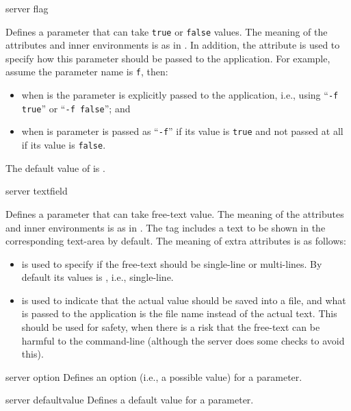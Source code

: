 \bigskip
\xmlstruct
{server}
{flag}
{%
%
  Defines a parameter that can take \texttt{true} or \texttt{false}
  values. The meaning of the attributes and inner environments is as
  in . In addition, the attribute
   is used to specify how this parameter
  should be passed to the application. For example, assume the
  parameter name is \texttt{f}, then:
  \begin{itemize}
  \item when  is  the
    parameter is explicitly passed to the application, i.e., using
    ``\texttt{-f true}'' or ``\texttt{-f false}''; and
  \item when  is 
    parameter is passed as ``\texttt{-f}'' if its value is
    \texttt{true} and not passed at all if its value is
    \texttt{false}.
  \end{itemize}
%
  The default value of  is
  .
%
}


\bigskip
\xmlstruct
{server}
{textfield}
{%
%
  Defines a parameter that can take free-text value. The meaning of
  the attributes and inner environments is as in
  . The  tag includes a text
  to be shown in the corresponding text-area by default.  The meaning
  of extra attributes is as follows:
%
\begin{itemize}
%
\item {} is used to specify if the free-text
  should be single-line or multi-lines. By default its values is
  , i.e., single-line.
%
\item {} is used to indicate that the actual
  value should be saved into a file, and what is passed to the
  application is the file name instead of the actual text. 
  This should be used for safety, when there is a risk that the
  free-text can be harmful to the command-line (although the server
  does some checks to avoid this).
%
\end{itemize}
}


\bigskip
\xmlstruct
{server}
{option}
{%
Defines an option (i.e., a possible value) for a parameter.
}


\bigskip
\xmlstruct
{server}
{defaultvalue}
{%
Defines a default value for a parameter.
}



